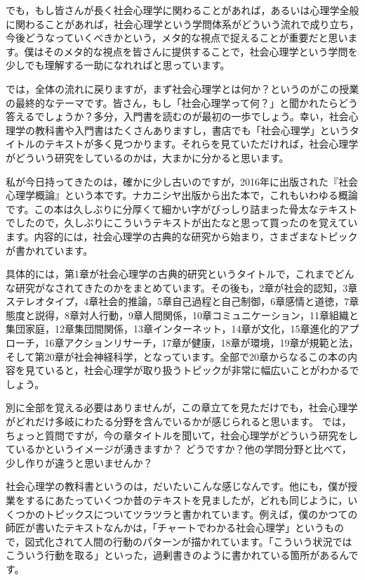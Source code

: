 \documentclass{ltjsbook}
\begin{document}
でも，もし皆さんが長く社会心理学に関わることがあれば，あるいは心理学全般に関わることがあれば，社会心理学という学問体系がどういう流れで成り立ち，今後どうなっていくべきかという，メタ的な視点で捉えることが重要だと思います。僕はそのメタ的な視点を皆さんに提供することで，社会心理学という学問を少しでも理解する一助になれればと思っています。

では，全体の流れに戻りますが，まず社会心理学とは何か？というのがこの授業の最終的なテーマです。皆さん，もし「社会心理学って何？」と聞かれたらどう答えるでしょうか？多分，入門書を読むのが最初の一歩でしょう。幸い，社会心理学の教科書や入門書はたくさんありますし，書店でも「社会心理学」というタイトルのテキストが多く見つかります。それらを見ていただければ，社会心理学がどういう研究をしているのかは，大まかに分かると思います。

私が今日持ってきたのは，確かに少し古いのですが，2016年に出版された『社会心理学概論』という本です\parencite{SPgairon2016}。ナカニシヤ出版から出た本で，これもいわゆる概論です。この本は久しぶりに分厚くて細かい字がびっしり詰まった骨太なテキストでしたので，久しぶりにこういうテキストが出たなと思って買ったのを覚えています。内容的には，社会心理学の古典的な研究から始まり，さまざまなトピックが書かれています。

具体的には，第1章が社会心理学の古典的研究というタイトルで，これまでどんな研究がなされてきたのかをまとめています。その後も，2章が社会的認知，3章ステレオタイプ，4章社会的推論，5章自己過程と自己制御，6章感情と道徳，7章態度と説得，8章対人行動，9章人間関係，10章コミュニケーション，11章組織と集団家庭，12章集団間関係，13章インターネット，14章が文化，15章進化的アプローチ，16章アクションリサーチ，17章が健康，18章が環境，19章が規範と法，そして第20章が社会神経科学，となっています。全部で20章からなるこの本の内容を見ていると，社会心理学が取り扱うトピックが非常に幅広いことがわかるでしょう。

別に全部を覚える必要はありませんが，この章立てを見ただけでも，社会心理学がどれだけ多岐にわたる分野を含んでいるかが感じられると思います。
では，ちょっと質問ですが，今の章タイトルを聞いて，社会心理学がどういう研究をしているかというイメージが湧きますか？ どうですか？他の学問分野と比べて，少し作りが違うと思いませんか？

社会心理学の教科書というのは，だいたいこんな感じなんです。他にも，僕が授業をするにあたっていくつか昔のテキストを見ましたが，どれも同じように，いくつかのトピックスについてツラツラと書かれています。例えば，僕のかつての師匠が書いたテキストなんかは，「チャートでわかる社会心理学」というもので\parencite{SPchart1994}，図式化されて人間の行動のパターンが描かれています。「こういう状況ではこういう行動を取る」といった，過剰書きのように書かれている箇所があるんです。
\end{document}
